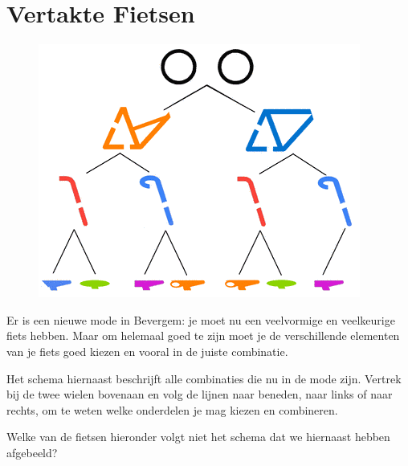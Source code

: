 \documentclass[12pt]{article}
\begin{document}
	\begin{minipage}{\textwidth}
		\section{Vertakte Fietsen}
			\begin{figure} 
				\includegraphics[width=\linewidth]{image1}
			\end{figure}
			Er is een nieuwe mode in Bevergem: je moet nu een veelvormige en veelkeurige fiets hebben. Maar om helemaal goed te zijn moet je de verschillende elementen van je fiets goed kiezen en vooral in de juiste combinatie.
			
			Het schema hiernaast beschrijft alle combinaties die nu in de mode zijn. Vertrek bij de twee wielen bovenaan en volg de lijnen naar beneden, naar links of naar rechts, om te weten welke onderdelen je mag kiezen en combineren.
			
			Welke van de fietsen hieronder volgt niet het schema dat we hiernaast hebben afgebeeld?
			\vspace{1cm}
			

\end{minipage}
\end{document}
